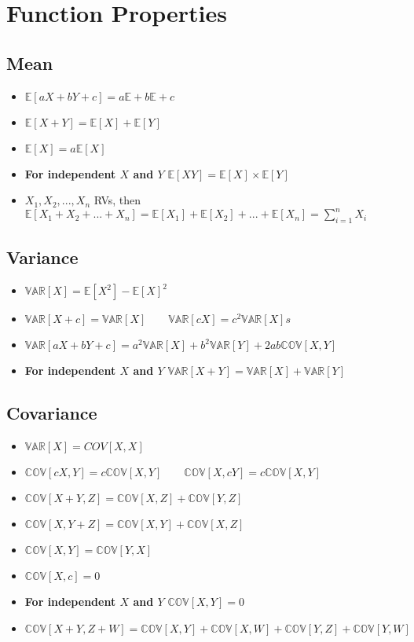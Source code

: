 \chapter{Function Properties}
\section{Mean}
\begin{itemize}
    \item \(\mathbb{E}[aX +bY + c] = a\mathbb{E} + b\mathbb{E} + c\)
    \item \(\mathbb{E}[X + Y] = \mathbb{E}[X] + \mathbb{E}[Y]\)
    \item \(\mathbb{E}[X] = a\mathbb{E}[X]\)
    \item \textbf{For independent \(X\) and \(Y\)} \(\mathbb{E}[XY] = \mathbb{E}[X] \times \mathbb{E}[Y]\)
    \item \(X_1,X_2,...,X_n\) RVs, then \(\mathbb{E}[X_1 + X_2 + ... + X_n] = \mathbb{E}[X_1] + \mathbb{E}[X_2] + ... + \mathbb{E}[X_n] = \sum_{i=1}^n X_i\)
\end{itemize}

\section{Variance}
\begin{itemize}
    \item \(\mathbb{VAR}[X] = \mathbb{E}[X^2] - \mathbb{E}[X]^2\)
    \item \(\mathbb{VAR}[X + c] = \mathbb{VAR}[X] \quad \quad \mathbb{VAR}[cX] = c^2\mathbb{VAR}[X]s\)
    \item \(\mathbb{VAR}[aX + bY + c] = a^2\mathbb{VAR}[X] + b^2\mathbb{VAR}[Y] + 2ab\mathbb{COV}[X, Y]\)
    \item \textbf{For independent \(X\) and \(Y\)} \(\mathbb{VAR}[X + Y] = \mathbb{VAR}[X] + \mathbb{VAR}[Y]\)
\end{itemize}

\section{Covariance}
\begin{itemize}
    \item \(\mathbb{VAR}[X] = COV[X,X]\)
    \item \(\mathbb{COV}[cX,Y] = c\mathbb{COV}[X,Y] \quad 
 \quad \mathbb{COV}[X,cY] = c\mathbb{COV}[X,Y]\)
    \item \(\mathbb{COV}[X + Y, Z] = \mathbb{COV}[X,Z] + \mathbb{COV}[Y,Z]\)
    \item \(\mathbb{COV}[X, Y + Z] = \mathbb{COV}[X,Y] + \mathbb{COV}[X,Z]\)
    \item \(\mathbb{COV}[X,Y] = \mathbb{COV}[Y,X]\)
    \item \(\mathbb{COV}[X,c] = 0\)
    \item \textbf{For independent \(X\) and \(Y\)} \(\mathbb{COV}[X,Y] = 0\)
    \item \(\mathbb{COV}[X + Y, Z + W] = \mathbb{COV}[X,Y] + \mathbb{COV}[X,W] + \mathbb{COV}[Y,Z] + \mathbb{COV}[Y,W]\)
\end{itemize}